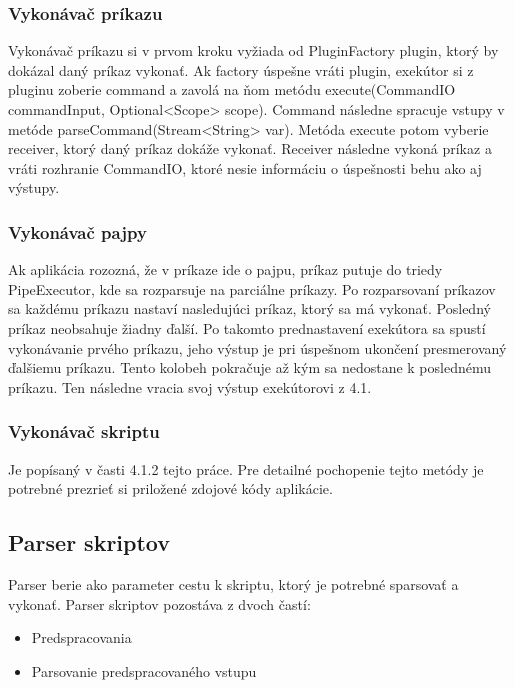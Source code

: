 \subsubsection{Vykonávač príkazu}
\indent Vykonávač príkazu si v prvom kroku vyžiada od PluginFactory plugin, ktorý by dokázal daný príkaz vykonať. Ak factory úspešne vráti plugin, exekútor si z pluginu zoberie command a zavolá na ňom metódu execute(CommandIO commandInput, Optional<Scope> scope). Command následne spracuje vstupy v metóde parseCommand(Stream<String> var). Metóda execute potom vyberie receiver, ktorý daný príkaz dokáže vykonať. Receiver následne vykoná príkaz a vráti rozhranie CommandIO, ktoré nesie informáciu o úspešnosti behu ako aj výstupy.

\subsubsection{Vykonávač pajpy}
\indent Ak aplikácia rozozná, že v príkaze ide o pajpu, príkaz putuje do triedy PipeExecutor, kde sa rozparsuje na parciálne príkazy. Po rozparsovaní príkazov sa každému príkazu nastaví nasledujúci príkaz, ktorý sa má vykonať. Posledný príkaz neobsahuje žiadny ďalší. Po takomto prednastavení exekútora sa spustí vykonávanie prvého príkazu, jeho výstup je pri úspešnom ukončení presmerovaný ďalšiemu príkazu. Tento kolobeh pokračuje až kým sa nedostane k poslednému príkazu. Ten následne vracia svoj výstup exekútorovi z 4.1.
\subsubsection{Vykonávač skriptu}
\indent Je popísaný v časti 4.1.2 tejto práce. Pre detailné pochopenie tejto metódy je potrebné prezrieť si priložené zdojové kódy aplikácie.
\subsection{Parser skriptov}
\indent Parser berie ako parameter cestu k skriptu, ktorý je potrebné sparsovať a vykonať. Parser skriptov pozostáva z dvoch častí: 
\begin{itemize}
	\item Predspracovania
	\item Parsovanie predspracovaného vstupu
\end{itemize}
